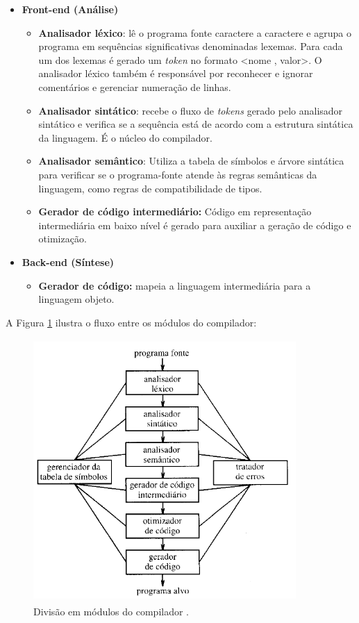 \begin{itemize}
    \item \textbf{Front-end (Análise)}
    \begin{itemize}
        \item \textbf{Analisador léxico}: lê o programa fonte caractere a caractere e agrupa o programa em sequências significativas denominadas lexemas. Para cada um dos lexemas é gerado um \textit{token} no formato <nome , valor>. O analisador léxico também é responsável por reconhecer e ignorar comentários e gerenciar numeração de linhas.
        \item \textbf{Analisador sintático}: recebe o fluxo de \textit{tokens} gerado pelo analisador sintático e verifica se a sequência está de acordo com a estrutura sintática da linguagem. É o núcleo do compilador.
        \item \textbf{Analisador semântico}: Utiliza a tabela de símbolos e árvore sintática para verificar se o programa-fonte atende às regras semânticas da linguagem, como regras de compatibilidade de tipos.
        \item \textbf{Gerador de código intermediário:} Código em representação intermediária em baixo nível é gerado para auxiliar a geração de código e otimização.
    \end{itemize}
    \item \textbf{Back-end (Síntese)}
    \begin{itemize}
        \item \textbf{Gerador de código:} mapeia a linguagem intermediária para a linguagem objeto. 
    \end{itemize}
\end{itemize}

A Figura \ref{fig:flow_modules} ilustra o fluxo entre os módulos do compilador:

\begin{figure}[!h]
\label{fig:flow_modules}
\centering
\includegraphics[width=10cm,height=10cm,keepaspectratio]{img/flow.png}
\caption{Divisão em módulos do compilador \cite{aho2007compilers}.}
\end{figure}


